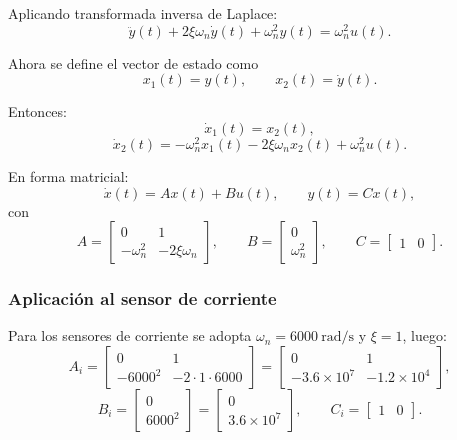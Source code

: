 \documentclass[12pt, a4paper,journal, onecolumn, compsoc]{IEEEtran}
\begin{document}
Aplicando transformada inversa de Laplace:
\begin{equation}
    \ddot{y}(t)+2\xi\omega_n \dot{y}(t)+\omega_n^2 y(t)=\omega_n^2 u(t).
\end{equation}

Ahora se define el vector de estado como
\begin{equation}
    x_1(t)=y(t), \qquad x_2(t)=\dot{y}(t).
\end{equation}

Entonces:
\begin{equation}
    \dot{x}_1(t)=x_2(t),
\end{equation}
\begin{equation}
    \dot{x}_2(t)= -\omega_n^2 x_1(t)-2\xi\omega_n x_2(t)+\omega_n^2 u(t).
\end{equation}

En forma matricial:
\begin{equation}
    \dot{x}(t)=Ax(t)+Bu(t), \qquad y(t)=Cx(t),
\end{equation}
con
\begin{equation}
    A=
    \begin{bmatrix}
        0 & 1 \\
        -\omega_n^2 & -2\xi\omega_n
    \end{bmatrix},
    \qquad
    B=
    \begin{bmatrix}
        0 \\
        \omega_n^2
    \end{bmatrix},
    \qquad
    C=
    \begin{bmatrix}
        1 & 0
    \end{bmatrix}.
\end{equation}

\subsubsection*{Aplicación al sensor de corriente}

Para los sensores de corriente se adopta $\omega_n=6000\ \text{rad/s}$ y $\xi=1$, luego:
\begin{equation}
    A_i=
    \begin{bmatrix}
        0 & 1 \\
        -6000^2 & -2\cdot 1 \cdot 6000
    \end{bmatrix}
    =
    \begin{bmatrix}
        0 & 1 \\
        -3.6\times 10^7 & -1.2\times 10^4
    \end{bmatrix},
\end{equation}
\begin{equation}
    B_i=
    \begin{bmatrix}
        0 \\
        6000^2
    \end{bmatrix}
    =
    \begin{bmatrix}
        0 \\
        3.6\times 10^7
    \end{bmatrix},
    \qquad
    C_i=
    \begin{bmatrix}
        1 & 0
    \end{bmatrix}.
\end{equation}
\end{document}
